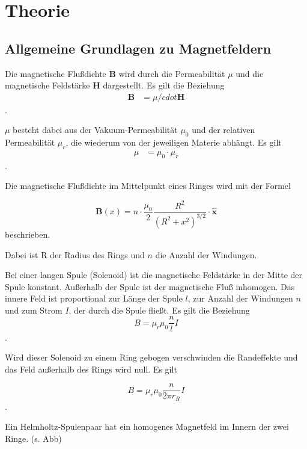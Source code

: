 \section{Theorie}
\label{sec:Theorie}

\cite{V308}

\subsection{Allgemeine Grundlagen zu Magnetfeldern}

Die magnetische Flußdichte $\symbf{B}$ wird durch die Permeabilität $\mu$ und die magnetische Feldstärke $\symbf{H}$ dargestellt. Es gilt die Beziehung 
\begin{align} 
\symbf{B} &= \mu /cdot \symbf{H}
\end{align}.

$\mu$ besteht dabei aus der Vakuum-Permeabilität $\mu_{0}$ und der relativen Permeabilität $\mu_{r}$, die wiederum von der jeweiligen Materie abhängt. 
Es gilt 
\begin{align} 
\mu &= \mu_{0} \cdot \mu_{r}
\end{align}.

Die magnetische Flußdichte im Mittelpunkt eines Ringes wird mit der Formel 

\begin{equation}
\symbf{B}(x)= n \cdot \frac{\mu_{0}}{2} \frac{R^2}{(R^2 +x^2)^{3/2}}\cdot \symbf{\hat{x}}
\end{equation}
beschrieben. 

Dabei ist R der Radius des Rings und $n$ die Anzahl der Windungen. 


Bei einer langen Spule (Solenoid) ist die magnetische Feldstärke in der Mitte der Spule konstant. Außerhalb der Spule ist der magnetische Fluß inhomogen. 
Das innere Feld ist proportional zur Länge der Spule $l$, zur Anzahl der Windungen $n$ und zum Strom $I$, der durch die Spule fließt. 
Es gilt die Beziehung
\begin{equation}
B = \mu_{r} \mu_{0} \frac{n}{l} I 
\end{equation}.

Wird dieser Solenoid zu einem Ring gebogen verschwinden die Randeffekte und das Feld außerhalb des Rings wird null. 
Es gilt

\begin{equation}
B = \mu_{r} \mu_{0} \frac{n}{2\pi r_{R}} I 
\end{equation}.

Ein Helmholtz-Spulenpaar hat ein homogenes Magnetfeld im Innern der zwei Ringe. (s. Abb) %

